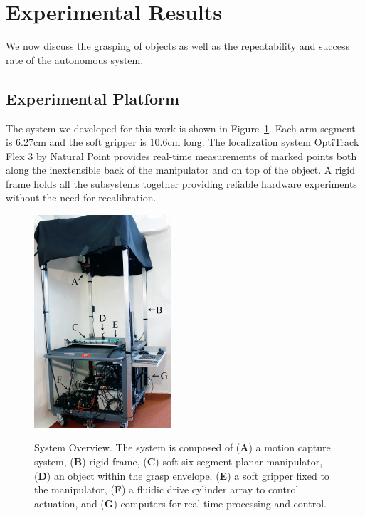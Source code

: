 \section{Experimental Results}
\label{sec:experimental_results}
We now discuss the grasping of objects as well as the repeatability and success rate of the autonomous system.
 
\subsection{Experimental Platform}
The  system we developed for this work is shown in Figure~\ref{fig:experimental_platform}.
Each arm segment is 6.27\unit{cm} and the soft gripper is 10.6\unit{cm} long.
The localization system OptiTrack Flex 3 by Natural Point provides real-time measurements of marked points both along the inextensible back of the manipulator and on top of the object. 
A rigid frame holds all the subsystems  together providing reliable hardware experiments without the need for recalibration.

\begin{figure}[htbp]
\begin{centering}
  \includegraphics[width=2.0in]{Figures/system_overview/sys_overview_smaller}\\
  \caption{System Overview. The system is composed of (\textbf{A}) a motion capture system, (\textbf{B}) rigid frame, (\textbf{C}) soft six segment planar manipulator, (\textbf{D}) an object within the grasp envelope, (\textbf{E}) a soft gripper fixed to the manipulator, (\textbf{F}) a fluidic drive cylinder array to control actuation, and (\textbf{G}) computers for real-time processing and control.} \label{fig:experimental_platform}
\end{centering}
\end{figure}


